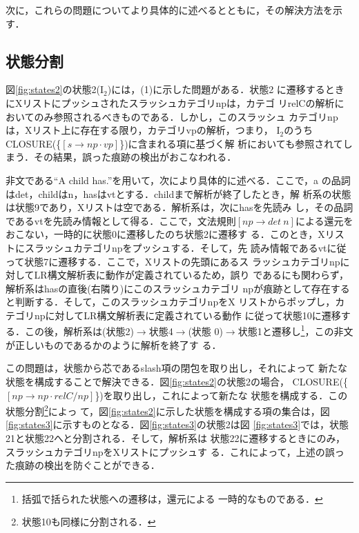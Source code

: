 次に，これらの問題についてより具体的に述べるとともに，その解決方法を示
す．

\subsection{状態分割}

図\ref{fig:states2}の状態2(I$_{2}$)には，(1)に示した問題がある．状態2 
に遷移するときにXリストにプッシュされたスラッシュカテゴリnpは，カテゴ
リrelCの解析においてのみ参照されるべきものである．しかし，このスラッシュ
カテゴリnpは，Xリスト上に存在する限り，カテゴリvpの解析，つまり，
I$_{2}$のうちCLOSURE(\{$[s \to np \cdot vp]$\})に含まれる項に基づく解
析においても参照されてしまう．その結果，誤った痕跡の検出がおこなわれる．

非文である``A child has.''を用いて，次により具体的に述べる．ここで，a 
の品詞はdet，childはn，hasはvtとする．childまで解析が終了したとき，解
析系の状態は状態9であり，Xリストは空である．解析系は，次にhasを先読み
し，その品詞であるvtを先読み情報として得る．ここで，文法規則$[np \to
det\ n]$による還元をおこない，一時的に状態0に遷移したのち状態2に遷移す
る．このとき，Xリストにスラッシュカテゴリnpをプッシュする．そして，先
読み情報であるvtに従って状態7に遷移する．ここで，Xリストの先頭にあるス
ラッシュカテゴリnpに対してLR構文解析表に動作が定義されているため，誤り
であるにも関わらず，解析系はhasの直後(右隣り)にこのスラッシュカテゴリ
npが痕跡として存在すると判断する．そして，このスラッシュカテゴリnpをX
リストからポップし，カテゴリnpに対してLR構文解析表に定義されている動作
に従って状態10に遷移する．この後，解析系は(状態2)$\to$状態4$\to$(状態
0)$\to$状態1と遷移し\footnote{括弧で括られた状態への遷移は，還元による
一時的なものである．}，この非文が正しいものであるかのように解析を終了す
る．

この問題は，状態から芯であるslash項の閉包を取り出し，それによって
新たな状態を構成することで解決できる．図\ref{fig:states2}の状態2の場合，
CLOSURE(\{$[np \to np \cdot relC/np]$\})を取り出し，これによって新たな
状態を構成する．この状態分割\footnote{状態10も同様に分割される．}によっ
て，図\ref{fig:states2}に示した状態を構成する項の集合は，図
\ref{fig:states3}に示すものとなる．図\ref{fig:states3}の状態2は図
\ref{fig:states3}では，状態21と状態22へと分割される．そして，解析系は
状態22に遷移するときにのみ，スラッシュカテゴリnpをXリストにプッシュす
る．これによって，上述の誤った痕跡の検出を防ぐことができる．

